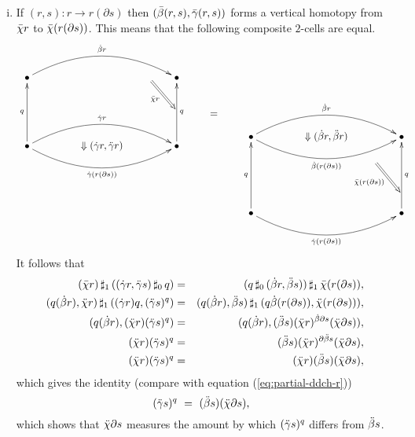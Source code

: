 \begin{enumerate}[(i)]
\item
If $(r,s) : r \to r(\partial s)$ then $(\bar{\beta}(r,s),\bar{\gamma}(r,s))$ forms a 
vertical homotopy from $\bar{\chi} r$ to $\bar{\chi}(r(\partial s))$. 
This means that the following composite $2$-cells are equal. 
$$
{\vcenter 
{\xy
\xymatrix @C=1.6pc{ 
    & & & & \\
  \bullet \ar@/^5ex/[rrrr]^{\db r}
    & & & \ar@{=>} [dr]_{\barch r}
          & \bullet \\
    & & & & \\
  \bullet \ar[uu]^q \ar@/^5ex/[rrrr]^{\dg r}
          \ar@/_5ex/[rrrr]_{\dg(r(\partial s))}
    & & \Downarrow(\dg r,\ddg r)
        & & \bullet \ar[uu]_q \\
    & & & & \\
}
\endxy}
\qquad=\qquad
{\xy 
\xymatrix @C=1.6pc@R=0.9pc{ 
    & & & & \\ 
  \bullet \ar@/^5ex/[rrrr]^{\db r} \ar@/_5ex/[rrrr]_{\db(r(\partial s))}
    & & \Downarrow(\db r,\ddb r)
        & & \bullet \\
    & & & \ar@{=>} [ddr]_{\barch(r(\partial s))}
          & \\ 
    & & & & \\
    & & & & \\ 
  \bullet \ar[uuuu]^q \ar@/_5ex/[rrrr]_{\dg(r(\partial s))}
    & & & & \bullet \ar[uuuu]_q \\ 
    & & & & \\ 
}
\endxy}
}$$
It follows that
\begin{eqnarray*}
       (\bar{\chi} r) \,\sharp_1\, ((\dot{\gamma} r,\ddot{\gamma} s) \,\sharp_0\, q)
 & = & (q \,\sharp_0\, (\dot{\beta} r,\ddot{\beta} s)) \,\sharp_1\, \bar{\chi}(r(\partial s)), \\
       (q(\dot{\beta} r),\ddot{\chi} r) \,\sharp_1\, ((\dot{\gamma} r)q,(\ddot{\gamma} s)^q)
 & = & (q(\dot{\beta} r),\ddot{\beta} s) \,\sharp_1\, (q\dot{\beta}(r(\partial s)),\ddot{\chi}(r(\partial s))), \\
       (q(\dot{\beta} r), (\ddot{\chi} r)(\ddot{\gamma} s)^q) 
 & = & (q(\dot{\beta} r),(\ddot{\beta} s)(\ddot{\chi} r)^{\dot{\beta}\partial s}(\ddot{\chi}\partial s)), \\ 
       (\ddot{\chi} r)(\ddot{\gamma} s)^q 
 & = & (\ddot{\beta} s)(\ddot{\chi} r)^{\partial\ddot{\beta} s}(\ddot{\chi}\partial s), \\
       (\ddot{\chi} r)(\ddot{\gamma} s)^q 
 & = & (\ddot{\chi} r)(\ddot{\beta} s)(\ddot{\chi}\partial s), 
\end{eqnarray*}
which gives the identity (compare with equation (\ref{eq:partial-ddch-r}))
\begin{equation} \label{eq:ddch-partial-r} 
(\ddot{\gamma} s)^q  ~=~  (\ddot{\beta} s)(\ddot{\chi}\partial s),~~ 
\end{equation}
which shows that $\ddot{\chi} \partial s$ measures the amount by which 
$(\ddot{\gamma} s)^q$ differs from $\ddot{\beta} s$.
\end{enumerate}

